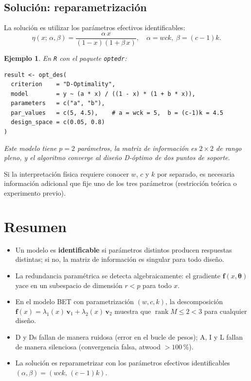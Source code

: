 \documentclass[11pt, a4paper]{article}
\newtheorem{example}{Ejemplo}
\DeclareMathOperator{\rank}{rank}
\newcommand{\btheta}{\boldsymbol{\theta}}
\newcommand{\ff}{\mathbf{f}}
\begin{document}
\subsection{Soluci\'on: reparametrizaci\'on}

La soluci\'on es utilizar los par\'ametros efectivos identificables:
\[
  \eta(x;\,\alpha,\beta) = \frac{\alpha\, x}{(1-x)(1 + \beta\, x)},
  \quad \alpha = wck,\; \beta = (c-1)k.
\]

\begin{example}
En \texttt{R} con el paquete \texttt{optedr}:
\begin{verbatim}
result <- opt_des(
  criterion    = "D-Optimality",
  model        = y ~ (a * x) / ((1 - x) * (1 + b * x)),
  parameters   = c("a", "b"),
  par_values   = c(5, 4.5),    # a = wck = 5,  b = (c-1)k = 4.5
  design_space = c(0.05, 0.8)
)
\end{verbatim}
Este modelo tiene $p = 2$ par\'ametros, la matriz de informaci\'on es $2\times 2$ de rango
pleno, y el algoritmo converge al dise\~no D-\'optimo de dos puntos de soporte.
\end{example}

Si la interpretaci\'on f\'isica requiere conocer $w$, $c$ y $k$ por separado, es necesaria
informaci\'on adicional que fije uno de los tres par\'ametros (restricci\'on te\'orica o
experimento previo).

\section{Resumen}

\begin{itemize}
  \item Un modelo es \textbf{identificable} si par\'ametros distintos producen respuestas
        distintas; si no, la matriz de informaci\'on es singular para todo dise\~no.
  \item La redundancia param\'etrica se detecta algebraicamente: el gradiente
        $\ff(x,\btheta)$ yace en un subespacio de dimensi\'on $r < p$ para todo $x$.
  \item En el modelo BET con parametrizaci\'on $(w,c,k)$, la descomposici\'on
        $\ff(x) = \lambda_1(x)\,\mathbf{v}_1 + \lambda_2(x)\,\mathbf{v}_2$ muestra que
        $\rank M \leq 2 < 3$ para cualquier dise\~no.
  \item D y Ds fallan de manera ruidosa (error en el bucle de pesos);
        A, I y L fallan de manera silenciosa (convergencia falsa, atwood $> 100\,\%$).
  \item La soluci\'on es reparametrizar con los par\'ametros efectivos identificables
        $(\alpha, \beta) = (wck,\, (c-1)k)$.
\end{itemize}
\end{document}
